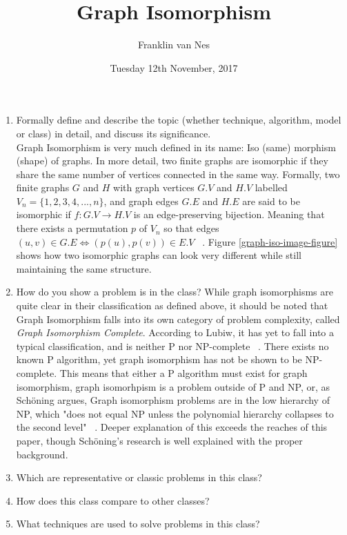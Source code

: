 \documentclass[letterpaper, 12pt]{article}
\begin{document}
\title{Graph Isomorphism}
\author{Franklin van Nes}
\date{Tuesday 12th November, 2017}
\maketitle

\begin{enumerate}
    \item Formally define and describe the topic (whether technique, algorithm, model or class) in detail, and discuss its significance.
    \\
    Graph Isomorphism is very much defined in its name: Iso (same) morphism (shape) of graphs.
    In more detail, two finite graphs are isomorphic if they share the same number of vertices connected in the same way.
    Formally, two finite graphs $G$ and $H$ with graph vertices $G.V$ and $H.V$ labelled $V_n = \{1, 2, 3, 4, ... , n\}$, and graph edges $G.E$ and $H.E$
    are said to be isomorphic if $f: G.V \rightarrow H.V$ is an edge-preserving bijection. Meaning
    that there exists a permutation $p$ of $V_n$ so that edges $(u, v) \in G.E \iff (p(u), p(v)) \in E.V$ ~\cite{gary-definer}.
    Figure \ref{graph-iso-image-figure} shows how two isomorphic graphs can look very different while still maintaining the same structure.

    \item How do you show a problem is in the class?
    While graph isomorphisms are quite clear in their classification as defined above, it should be noted that Graph Isomorphism
    falls into its own category of problem complexity, called \textit{Graph Isomorphism Complete}.
    According to Lubiw, it has yet to fall into a typical classification, and is neither P nor NP-complete ~\cite{anna-complexity}.
    There exists no known P algorithm, yet graph isomorphism has not be shown to be NP-complete. This means that either a P algorithm
    must exist for graph isomorphism, graph isomorhpism is a problem outside of P and NP, or, as Schöning argues, Graph isomorphism problems are in the low hierarchy of NP,
    which "does not equal NP unless the polynomial hierarchy collapses to the second level" ~\cite{np-hierarchy}.
    Deeper explanation of this exceeds the reaches of this paper, though Schöning's research is well explained with the proper background.
    \item Which are representative or classic problems in this class?
    \item How does this class compare to other classes?
    \item What techniques are used to solve problems in this class?

\end{enumerate}
\end{document}

